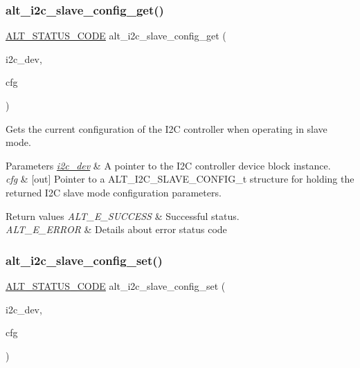 \subsubsection{\texorpdfstring{alt\_i2c\_slave\_config\_get()}{alt\_i2c\_slave\_config\_get()}}
{\footnotesize\ttfamily \mbox{\hyperlink{hwlib_8h_abdb0d369f069723ca55d6c94bcaaaa12}{A\+L\+T\+\_\+\+S\+T\+A\+T\+U\+S\+\_\+\+C\+O\+DE}} alt\+\_\+i2c\+\_\+slave\+\_\+config\+\_\+get (\begin{DoxyParamCaption}\item[{\mbox{\hyperlink{structALT__I2C__DEV__s}{A\+L\+T\+\_\+\+I2\+C\+\_\+\+D\+E\+V\+\_\+t}} $\ast$}]{i2c\+\_\+dev,  }\item[{\mbox{\hyperlink{group__ALT__I2C_ga9c0d22378cb1d6eb0194ca424026081d}{A\+L\+T\+\_\+\+I2\+C\+\_\+\+S\+L\+A\+V\+E\+\_\+\+C\+O\+N\+F\+I\+G\+\_\+t}} $\ast$}]{cfg }\end{DoxyParamCaption})}

Gets the current configuration of the I2C controller when operating in slave mode.


\begin{DoxyParams}{Parameters}
{\em \mbox{\hyperlink{structi2c__dev}{i2c\+\_\+dev}}} & A pointer to the I2C controller device block instance.\\
\hline
{\em cfg} & \mbox{[}out\mbox{]} Pointer to a A\+L\+T\+\_\+\+I2\+C\+\_\+\+S\+L\+A\+V\+E\+\_\+\+C\+O\+N\+F\+I\+G\+\_\+t structure for holding the returned I2C slave mode configuration parameters.\\
\hline
\end{DoxyParams}

\begin{DoxyRetVals}{Return values}
{\em A\+L\+T\+\_\+\+E\+\_\+\+S\+U\+C\+C\+E\+SS} & Successful status. \\
\hline
{\em A\+L\+T\+\_\+\+E\+\_\+\+E\+R\+R\+OR} & Details about error status code \\
\hline
\end{DoxyRetVals}
\mbox{\label{group__ALT__I2C_gaf11d526a49799f04d8f5336bce0dde18}} 
\subsubsection{\texorpdfstring{alt\_i2c\_slave\_config\_set()}{alt\_i2c\_slave\_config\_set()}}
{\footnotesize\ttfamily \mbox{\hyperlink{hwlib_8h_abdb0d369f069723ca55d6c94bcaaaa12}{A\+L\+T\+\_\+\+S\+T\+A\+T\+U\+S\+\_\+\+C\+O\+DE}} alt\+\_\+i2c\+\_\+slave\+\_\+config\+\_\+set (\begin{DoxyParamCaption}\item[{\mbox{\hyperlink{structALT__I2C__DEV__s}{A\+L\+T\+\_\+\+I2\+C\+\_\+\+D\+E\+V\+\_\+t}} $\ast$}]{i2c\+\_\+dev,  }\item[{const \mbox{\hyperlink{group__ALT__I2C_ga9c0d22378cb1d6eb0194ca424026081d}{A\+L\+T\+\_\+\+I2\+C\+\_\+\+S\+L\+A\+V\+E\+\_\+\+C\+O\+N\+F\+I\+G\+\_\+t}} $\ast$}]{cfg }\end{DoxyParamCaption})}

